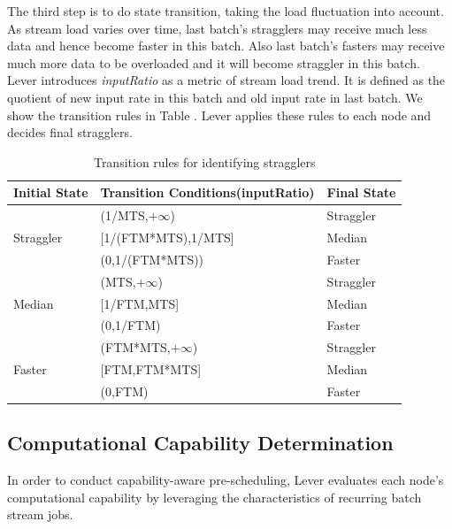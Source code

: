   The third step is to do state transition, taking the load fluctuation into account. As stream load varies over time, last batch's stragglers may receive much less data and hence become faster in this batch. Also last batch's fasters may receive much more data to be overloaded and it will become straggler in this batch. Lever introduces \emph{inputRatio} as a metric of stream load trend. It is defined as the quotient of new input rate in this batch and old input rate in last batch. We show the transition rules in Table \uppercase\expandafter{}. Lever applies these rules to each node and decides final stragglers.
  \begin{table}[htbp]
    \footnotesize
    \centering
    \caption{Transition rules for identifying stragglers}
    \begin{threeparttable}
    \centering
      \begin{tabular}{|p{1.5cm}|p{4.3cm}|p{1.4cm}|}
        \hline
        Initial State & Transition Conditions(inputRatio) & Final State \\
        \hline
        \multirow{3}{2cm}{Straggler} &
        (1/MTS,$+\infty$) & Straggler \\
        \cline{2-3}
        & [1/(FTM*MTS),1/MTS] & Median \\
        \cline{2-3}
        & (0,1/(FTM*MTS)) & Faster \\
        \hline
        \multirow{3}{2cm}{Median} &
        (MTS,$+\infty$) & Straggler \\
        \cline{2-3}
        & [1/FTM,MTS] & Median \\
        \cline{2-3}
        & (0,1/FTM) & Faster \\
        \hline
        \multirow{3}{2cm}{Faster} &
        (FTM*MTS,$+\infty$) & Straggler \\
        \cline{2-3}
        & [FTM,FTM*MTS] & Median \\
        \cline{2-3}
        & (0,FTM) & Faster \\
        \hline
      \end{tabular}
    \end{threeparttable}
    \label{Table1}
  \end{table}

\subsection{Computational Capability Determination}

  In order to conduct capability-aware pre-scheduling, Lever evaluates each node's computational capability by leveraging the characteristics of recurring batch stream jobs.

